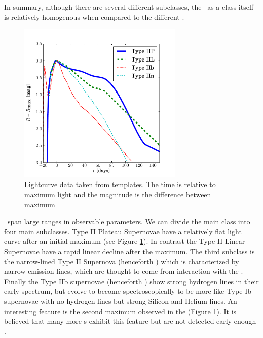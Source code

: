 In summary, although there are several different subclasses, the \snia\ as a class itself is relatively homogenous when compared to the different \sneii.

\begin{figure}[htbp] %
   \centering
   \includegraphics[width=0.7\textwidth]{chapter_intro/plots/plot_li11_lc_type2.pdf} 
   \caption{Lightcurve data taken from \citet{2011MNRAS.412.1441L} templates. The time is relative to maximum light and the magnitude is the difference between maximum  }
   \label{fig:snii_lc}
\end{figure}

\sneii\ span large ranges in observable parameters. We can divide the main class into four main subclasses. Type II Plateau Supernovae \citep[henceforth \sniip;][]{1979A&A....72..287B} have a relatively flat light curve after an initial maximum (see Figure \ref{fig:snii_lc}). In contrast the Type II Linear Supernovae \citep[henceforth \sniil;][]{1990MNRAS.244..269S} have a rapid linear decline after the maximum. The third subclass is the narrow-lined Type II Supernova (henceforth \sniin) which is characterized by narrow emission lines, which are thought to come from interaction with the \csm. 
Finally the Type IIb supernovae (henceforth \sniib) show strong hydrogen lines in their early spectrum, but evolve to become spectroscopically to be more like Type Ib supernovae with no hydrogen lines but strong Silicon and Helium lines. An interesting feature is the second maximum observed in the \sniib {} (Figure \ref{fig:snii_lc}). It is believed that many more \sniib s exhibit this feature but are not detected early enough \citep[this feature has also been seen in SN2008D a  \snib][]{2008Natur.453..469S, 2009ApJ...702..226M}. 


